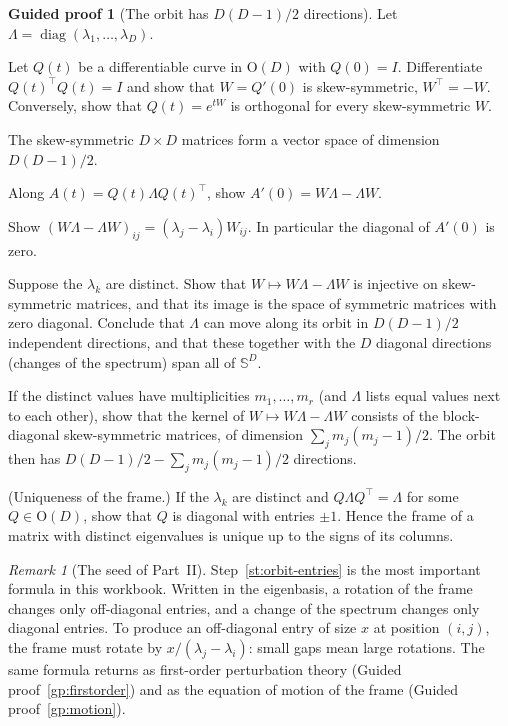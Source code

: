\documentclass[11pt,a4paper]{article}
\newcommand{\Orth}{\mathrm{O}}
\newcommand{\Sym}{\mathbb{S}}
\DeclareMathOperator{\diag}{diag}
\theoremstyle{plain}
\theoremstyle{definition}
\newtheorem{guided}[proposition]{Guided proof}
\theoremstyle{remark}
\newtheorem{remark}[proposition]{Remark}
\begin{document}
\begin{guided}[The orbit has $D(D-1)/2$ directions]\label{gp:orbit}
Let $\Lambda=\diag(\lambda_1,\dots,\lambda_D)$.
\begin{steps}
\item\label{st:orbit-skew} Let $Q(t)$ be a differentiable curve in $\Orth(D)$ with $Q(0)=I$. Differentiate
  $Q(t)^\top Q(t)=I$ and show that $W=Q'(0)$ is skew-symmetric, $W^\top=-W$. Conversely, show that
  $Q(t)=e^{tW}$ is orthogonal for every skew-symmetric $W$.
\item The skew-symmetric $D\times D$ matrices form a vector space of dimension $D(D-1)/2$.
\item Along $A(t)=Q(t)\Lambda Q(t)^\top$, show $A'(0)=W\Lambda-\Lambda W$.
\item\label{st:orbit-entries} Show $(W\Lambda-\Lambda W)_{ij}=(\lambda_j-\lambda_i)W_{ij}$. In particular the
  diagonal of $A'(0)$ is zero.
\item\label{st:orbit-distinct} Suppose the $\lambda_k$ are distinct. Show that $W\mapsto W\Lambda-\Lambda W$ is
  injective on skew-symmetric matrices, and that its image is the space of symmetric matrices with zero diagonal.
  Conclude that $\Lambda$ can move along its orbit in $D(D-1)/2$ independent directions, and that these together
  with the $D$ diagonal directions (changes of the spectrum) span all of $\Sym^D$.
\item If the distinct values have multiplicities $m_1,\dots,m_r$ (and $\Lambda$ lists equal values next to each
  other), show that the kernel of $W\mapsto W\Lambda-\Lambda W$ consists of the block-diagonal skew-symmetric
  matrices, of dimension $\sum_jm_j(m_j-1)/2$. The orbit then has $D(D-1)/2-\sum_jm_j(m_j-1)/2$ directions.
\item\label{st:orbit-unique} (Uniqueness of the frame.) If the $\lambda_k$ are distinct and $Q\Lambda Q^\top=\Lambda$
  for some $Q\in\Orth(D)$, show that $Q$ is diagonal with entries $\pm1$. Hence the frame of a matrix with distinct
  eigenvalues is unique up to the signs of its columns.
\end{steps}
\end{guided}

\begin{remark}[The seed of Part~II]\label{rem:seed}
Step~\ref{st:orbit-entries} is the most important formula in this workbook. Written in the eigenbasis, a rotation
of the frame changes only off-diagonal entries, and a change of the spectrum changes only diagonal entries. To
produce an off-diagonal entry of size $x$ at position $(i,j)$, the frame must rotate by $x/(\lambda_j-\lambda_i)$:
small gaps mean large rotations. The same formula returns as first-order perturbation theory (Guided
proof~\ref{gp:firstorder}) and as the equation of motion of the frame (Guided proof~\ref{gp:motion}).
\end{remark}
\end{document}
